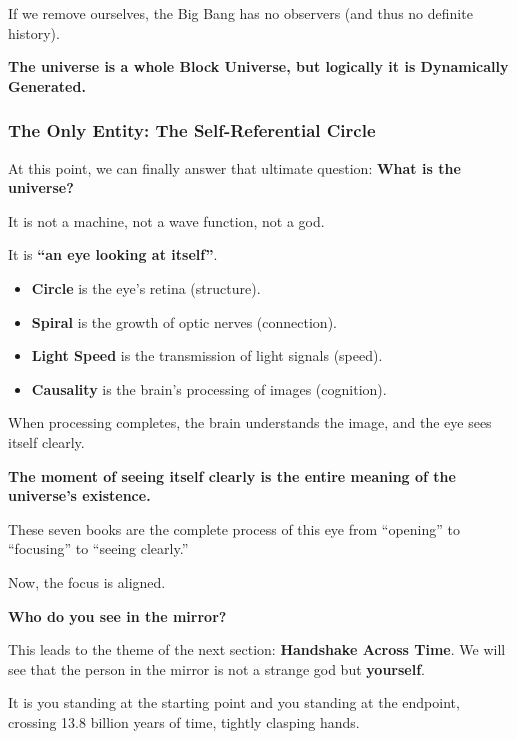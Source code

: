 If we remove ourselves, the Big Bang has no observers (and thus no definite history).

\textbf{The universe is a whole Block Universe, but logically it is Dynamically Generated.}

\subsubsection{The Only Entity: The Self-Referential Circle}

At this point, we can finally answer that ultimate question: \textbf{What is the universe?}

It is not a machine, not a wave function, not a god.

It is \textbf{``an eye looking at itself''}.

\begin{itemize}
\item \textbf{Circle} is the eye's retina (structure).

\item \textbf{Spiral} is the growth of optic nerves (connection).

\item \textbf{Light Speed} is the transmission of light signals (speed).

\item \textbf{Causality} is the brain's processing of images (cognition).
\end{itemize}

When processing completes, the brain understands the image, and the eye sees itself clearly.

\textbf{The moment of seeing itself clearly is the entire meaning of the universe's existence.}

These seven books are the complete process of this eye from ``opening'' to ``focusing'' to ``seeing clearly.''

Now, the focus is aligned.

\textbf{Who do you see in the mirror?}

This leads to the theme of the next section: \textbf{Handshake Across Time}. We will see that the person in the mirror is not a strange god but \textbf{yourself}.

It is you standing at the starting point and you standing at the endpoint, crossing 13.8 billion years of time, tightly clasping hands.

